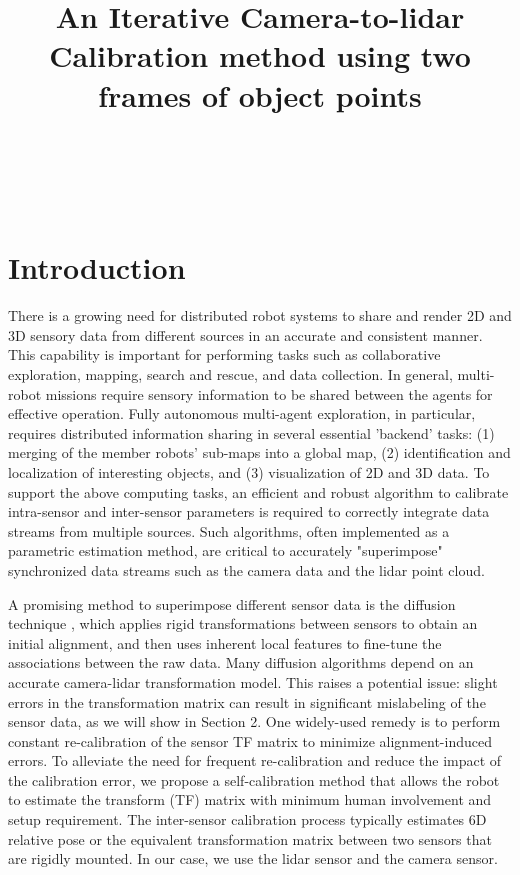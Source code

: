 \documentclass[journal]{IEEEtran}
\title{ An Iterative Camera-to-lidar Calibration method using two frames of object points}
\author{\IEEEauthorblockN{
Ju Wong {*}, Venkat R. Dasari{**},  Billy Geerhart {***}, Brian Rapp{***}, Peng Wang{***}}
\\
\IEEEauthorblockA{*}{ Virginia State University, Blacksburg, VA}\\
\IEEEauthorblockA{**}{DEVCOM ARL Army Research Office, Aberdeen Proving Ground, MD 21005}\\
\IEEEauthorblockA{***}{DEVCOM Army Research Laboratory, Aberdeen Proving Ground, MD 21005}
}
\begin{document}
\maketitle

\section{Introduction}

\noindent

There is a growing need for distributed robot systems to share and render 2D and 3D sensory data from different sources in an accurate and consistent manner. This capability is important for performing tasks such as collaborative exploration, mapping,
search and rescue, and data collection. 
In general, multi-robot missions require sensory information to be shared between
the agents for effective operation. Fully autonomous multi-agent
exploration, in particular, requires distributed information sharing in several essential 'backend' tasks: (1) merging of the member robots' sub-maps into a global map, (2) identification and localization of interesting objects, and (3) visualization of 2D and 3D data. To support the above computing tasks, an efficient and robust algorithm to calibrate intra-sensor and inter-sensor parameters is required to correctly integrate data streams from multiple sources. 
Such algorithms,  often implemented as a parametric estimation method, are critical to accurately "superimpose" synchronized data streams such as the camera data and the lidar point cloud.

A promising method to superimpose different sensor data is the diffusion technique \cite{wang2019ldls}, which applies rigid transformations between sensors to obtain an initial alignment, and then uses inherent local features to fine-tune the associations between the raw data. 
Many diffusion algorithms depend on an accurate camera-lidar transformation model. This raises a potential issue: slight errors in the transformation matrix can result in significant mislabeling of the sensor data, as we will show in Section 2. One widely-used remedy is to perform constant re-calibration of the sensor TF matrix to minimize alignment-induced errors. To alleviate the need for frequent re-calibration and reduce the impact of the calibration error, we propose a self-calibration method that allows the robot to estimate the transform (TF) matrix with minimum human involvement and setup requirement. The inter-sensor calibration process typically estimates 6D relative pose or the equivalent transformation matrix between two sensors that are rigidly mounted. In our case, we use the lidar sensor and the camera sensor.
\end{document}
